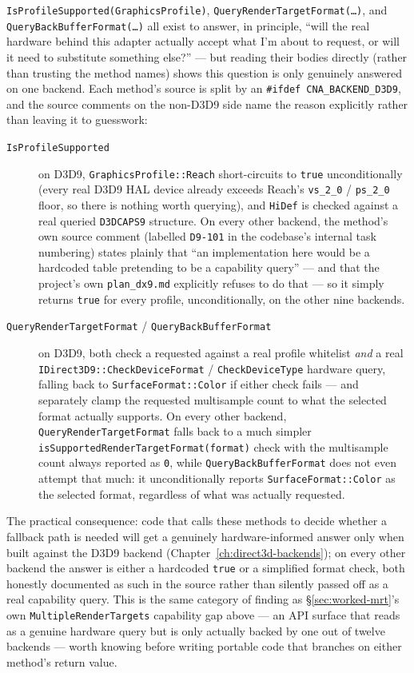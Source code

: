 \texttt{IsProfileSupported(GraphicsProfile)}, \texttt{QueryRenderTargetFormat(\ldots)}, and
\texttt{QueryBackBufferFormat(\ldots)} all exist to answer, in principle, ``will the real
hardware behind this adapter actually accept what I'm about to request, or will it need to
substitute something else?'' --- but reading their bodies directly (rather than trusting the
method names) shows this question is only genuinely answered on one backend. Each method's
source is split by an \texttt{\#ifdef CNA\_BACKEND\_D3D9}, and the source comments on the
non-D3D9 side name the reason explicitly rather than leaving it to guesswork:

\begin{description}
\item[\texttt{IsProfileSupported}] on D3D9, \texttt{GraphicsProfile::Reach} short-circuits to
  \texttt{true} unconditionally (every real D3D9 HAL device already exceeds Reach's
  \texttt{vs\_2\_0} / \texttt{ps\_2\_0} floor, so there is nothing worth querying), and
  \texttt{HiDef} is checked against a real queried \texttt{D3DCAPS9} structure. On every other
  backend, the method's own source comment (labelled \texttt{D9-101} in the codebase's internal
  task numbering) states plainly that ``an implementation here would be a hardcoded table
  pretending to be a capability query'' --- and that the project's own \texttt{plan\_dx9.md}
  explicitly refuses to do that --- so it simply returns \texttt{true} for every profile,
  unconditionally, on the other nine backends.
\item[\texttt{QueryRenderTargetFormat} / \texttt{QueryBackBufferFormat}] on D3D9, both check a
  requested  against a real profile whitelist \emph{and} a real
  \texttt{IDirect3D9::CheckDeviceFormat} / \texttt{CheckDeviceType} hardware query, falling back
  to \texttt{SurfaceFormat::Color} if either check fails --- and separately clamp the requested
  multisample count to what the selected format actually supports. On every other backend,
  \texttt{QueryRenderTargetFormat} falls back to a much simpler
  \texttt{isSupportedRenderTargetFormat(format)} check with the multisample count always
  reported as \texttt{0}, while \texttt{QueryBackBufferFormat} does not even attempt that much:
  it unconditionally reports \texttt{SurfaceFormat::Color} as the selected format, regardless
  of what was actually requested.
\end{description}

The practical consequence: code that calls these methods to decide whether a fallback path is
needed will get a genuinely hardware-informed answer only when built against the D3D9 backend
(Chapter~\ref{ch:direct3d-backends}); on every other backend the answer is either a hardcoded
\texttt{true} or a simplified format check, both honestly documented as such in the source
rather than silently passed off as a real capability query. This is the same category of
finding as \S\ref{sec:worked-mrt}'s own \texttt{MultipleRenderTargets} capability gap above ---
an API surface that reads as a genuine hardware query but is only actually backed by one out of
twelve backends --- worth knowing before writing portable code that branches on either method's
return value.


